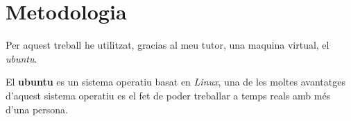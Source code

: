 \chapter{Metodologia}
Per aquest treball he utilitzat, gracias al meu tutor, una maquina virtual, el \textit{ubuntu}.
\vspace{0.3truecm}

El \textbf{ubuntu} es un sistema operatiu basat en \textit{Linux}, una de les moltes avantatges d'aquest sistema operatiu es el fet de poder treballar a temps reals amb més d'una persona.
